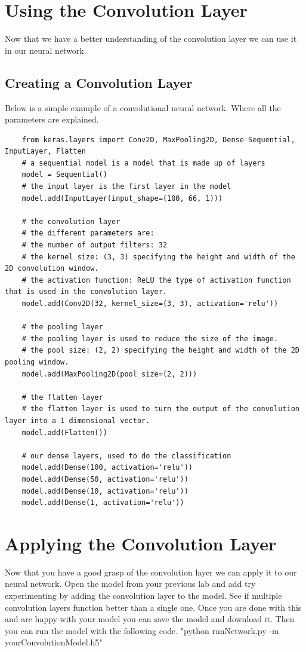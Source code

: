 \documentclass[11pt]{report}
\begin{document}
\clearpage

\chapter{Using the Convolution Layer}
Now that we have a better understanding of the convolution layer we can use it in our neural network.
\section{Creating a Convolution Layer}
Below is a simple example of a convolutional neural network. Where all the parameters are explained.
\begin{verbatim} 
    from keras.layers import Conv2D, MaxPooling2D, Dense Sequential, InputLayer, Flatten
    # a sequential model is a model that is made up of layers
    model = Sequential()
    # the input layer is the first layer in the model
    model.add(InputLayer(input_shape=(100, 66, 1)))

    # the convolution layer
    # the different parameters are:
    # the number of output filters: 32
    # the kernel size: (3, 3) specifying the height and width of the 2D convolution window.
    # the activation function: ReLU the type of activation function that is used in the convolution layer.
    model.add(Conv2D(32, kernel_size=(3, 3), activation='relu'))

    # the pooling layer
    # the pooling layer is used to reduce the size of the image.
    # the pool size: (2, 2) specifying the height and width of the 2D pooling window.
    model.add(MaxPooling2D(pool_size=(2, 2)))

    # the flatten layer
    # the flatten layer is used to turn the output of the convolution layer into a 1 dimensional vector.
    model.add(Flatten())

    # our dense layers, used to do the classification
    model.add(Dense(100, activation='relu'))
    model.add(Dense(50, activation='relu'))
    model.add(Dense(10, activation='relu'))
    model.add(Dense(1, activation='relu'))
\end{verbatim}

\chapter{Applying the Convolution Layer}
Now that you have a good grasp of the convolution layer we can apply it to our neural network. Open the model from your previous lab and add try experimenting by adding the convolution layer to the model. See if multiple convolution layers function better than a single one. Once you are done with this and are happy with your model you can save the model and download it. Then you can run the model with the following code.
"python runNetwork.py -m yourConvolutionModel.h5"

\end{document}
